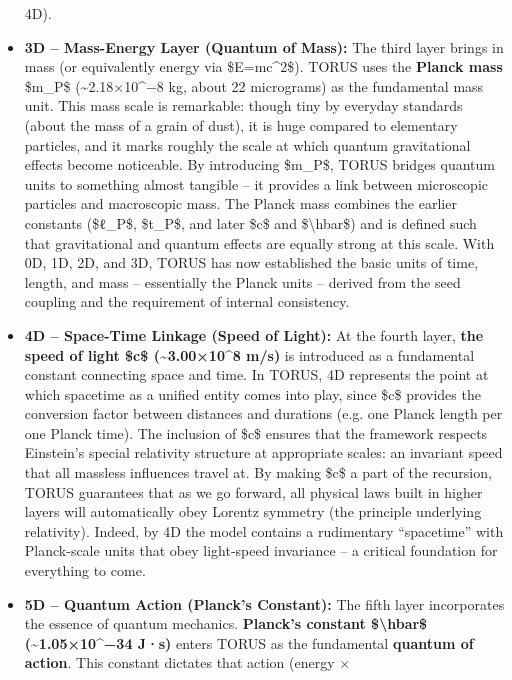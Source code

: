 \documentclass[
]{article}
\begin{document}
\begin{itemize}
  4D).
\item
  \textbf{3D -- Mass-Energy Layer (Quantum of Mass):} The third layer
  brings in mass (or equivalently energy via \$E=mc\^{}2\$). TORUS uses
  the \textbf{Planck mass} \$m\_P\$ (\textasciitilde2.18×10\^{}−8 kg,
  about 22 micrograms) as the fundamental mass unit\hspace{0pt}. This
  mass scale is remarkable: though tiny by everyday standards (about the
  mass of a grain of dust), it is huge compared to elementary particles,
  and it marks roughly the scale at which quantum gravitational effects
  become noticeable. By introducing \$m\_P\$, TORUS bridges quantum
  units to something almost tangible -- it provides a link between
  microscopic particles and macroscopic mass. The Planck mass combines
  the earlier constants (\$ℓ\_P\$, \$t\_P\$, and later \$c\$ and
  \$\textbackslash hbar\$) and is defined such that gravitational and
  quantum effects are equally strong at this scale. With 0D, 1D, 2D, and
  3D, TORUS has now established the basic units of time, length, and
  mass -- essentially the Planck units -- derived from the seed coupling
  and the requirement of internal consistency.
\item
  \textbf{4D -- Space-Time Linkage (Speed of Light):} At the fourth
  layer, \textbf{the speed of light \$c\$ (\textasciitilde3.00×10\^{}8
  m/s)} is introduced as a fundamental constant connecting space and
  time\hspace{0pt}. In TORUS, 4D represents the point at which spacetime
  as a unified entity comes into play, since \$c\$ provides the
  conversion factor between distances and durations (e.g. one Planck
  length per one Planck time). The inclusion of \$c\$ ensures that the
  framework respects Einstein's special relativity structure at
  appropriate scales: an invariant speed that all massless influences
  travel at. By making \$c\$ a part of the recursion, TORUS guarantees
  that as we go forward, all physical laws built in higher layers will
  automatically obey Lorentz symmetry (the principle underlying
  relativity). Indeed, by 4D the model contains a rudimentary
  ``spacetime'' with Planck-scale units that obey light-speed invariance
  -- a critical foundation for everything to come.
\item
  \textbf{5D -- Quantum Action (Planck's Constant):} The fifth layer
  incorporates the essence of quantum mechanics. \textbf{Planck's
  constant \$\textbackslash hbar\$ (\textasciitilde1.05×10\^{}−34 J·s)}
  enters TORUS as the fundamental \textbf{quantum of
  action}\hspace{0pt}. This constant dictates that action (energy ×

\end{itemize}
\end{document}
